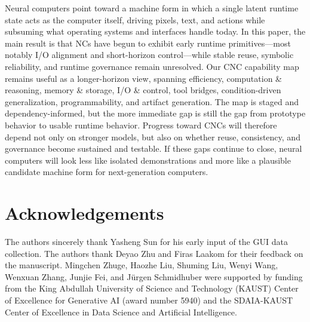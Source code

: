 Neural computers point toward a machine form in which a single latent runtime state acts as the computer itself, driving pixels, text, and actions while subsuming what operating systems and interfaces handle today.
In this paper, the main result is that NCs have begun to exhibit early runtime primitives---most notably I/O alignment and short-horizon control---while stable reuse, symbolic reliability, and runtime governance remain unresolved.
Our CNC capability map remains useful as a longer-horizon view, spanning efficiency, computation \& reasoning, memory \& storage, I/O \& control, tool bridges, condition-driven generalization, programmability, and artifact generation.
The map is staged and dependency-informed, but the more immediate gap is still the gap from prototype behavior to usable runtime behavior.
Progress toward CNCs will therefore depend not only on stronger models, but also on whether reuse, consistency, and governance become sustained and testable.
If these gaps continue to close, neural computers will look less like isolated demonstrations and more like a plausible candidate machine form for next-generation computers.

\section*{Acknowledgements}
The authors sincerely thank Yasheng Sun for his early input of the GUI data collection.  
The authors  thank Deyao Zhu and Firas Laakom for their feedback on the manuscript.  
Mingchen Zhuge, Haozhe Liu, Shuming Liu, Wenyi Wang, Wenxuan Zhang, Junjie Fei, and Jürgen Schmidhuber were supported by funding from the King Abdullah University of Science and Technology (KAUST) Center of Excellence for Generative AI (award number 5940) and the SDAIA-KAUST Center of Excellence in Data Science and Artificial Intelligence.
